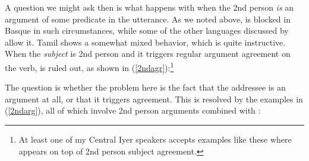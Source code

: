 \documentclass[output=paper, modfonts, nonflat]{langsci/langscibook}
\begin{document}
A question we might ask then is what happens with \allagr{} when the
2nd person \emph{is} an argument of some predicate in the
utterance. As we noted above, \allagr{} is blocked in Basque in such
circumstances, while some of the other languages discussed by
\citet{antonov:2015} allow it. Tamil shows a somewhat mixed behavior,
which is quite instructive. When the \emph{subject} is 2nd person and
it triggers regular argument agreement on the verb, \allagr{} is ruled
out, as shown in (\ref{2ndagr}):\footnote{At least one of my Central
  Iyer speakers accepts examples like these where \allagr{} appears on
  top of 2nd person subject agreement.}

\ea\label{2ndagr}
  \z
\z
%
The question is whether the problem here is the fact that the
addressee is an argument at all, or that it triggers
agreement. %
This is resolved by the examples in (\ref{2ndarg}), all of which
involve 2nd person arguments combined with \allagr:
\end{document}
